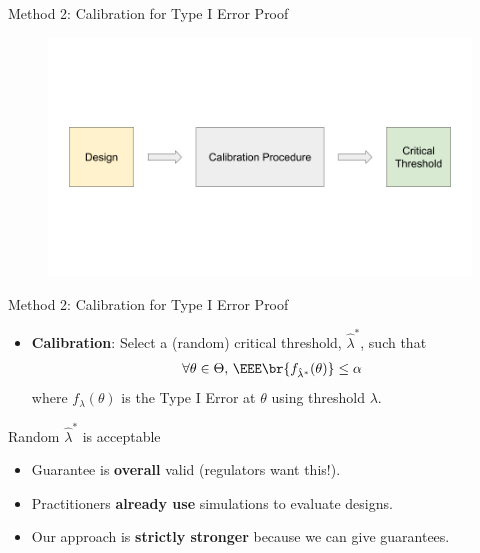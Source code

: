 \begin{frame}{Method 2: Calibration for Type I Error Proof}
\begin{figure}
    \centering
    \includegraphics[width=\linewidth]{figs/calibration_scheme.png}
\end{figure}
\end{frame}

\begin{frame}{Method 2: Calibration for Type I Error Proof}
\begin{itemize}
    \item \textbf{Calibration}: 
        Select a (random) critical threshold, $\hat{\lambda}^*$, such that 
        \begin{align*}
        \forall \theta \in \Theta,\, 
        \EEE\br{f_{\hat{\lambda}^*}(\theta)} 
        \leq 
        \alpha
        \end{align*}
        where $f_{\lambda}(\theta)$ is the Type I Error at $\theta$
        using threshold $\lambda$.
\end{itemize} 
\end{frame}

\begin{frame}{Random $\hat{\lambda}^*$ is acceptable}
\begin{itemize}
    \item Guarantee is \textbf{overall} valid (regulators want this!).
    \item Practitioners \textbf{already use} simulations to evaluate designs.
    \item Our approach is \textbf{strictly stronger} because we can give guarantees.
\end{itemize}
\end{frame}

